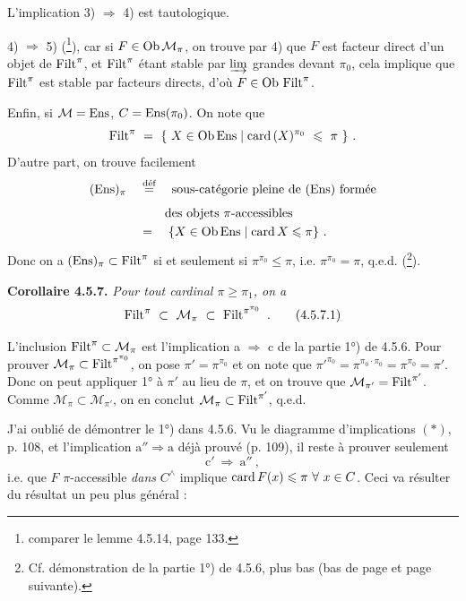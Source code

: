 L'implication 3) $\Longrightarrow$ 4) est tautologique.

4) $\Longrightarrow$ 5) (\footnote{comparer le lemme 4.5.14, page 133.}), car si $F \in \mathrm{Ob}\, \mathcal{M}_\pi$, on trouve par 4) que $F$ est facteur direct d'un objet de $\operatorname{Filt}^\pi$, et $\operatorname{Filt}^\pi$ étant stable par $\varinjlim$
grandes devant $\pi_0$, cela implique que $\operatorname{Filt}^\pi$ est stable par facteurs directs, d'où $F \in \mathrm{Ob}\, \operatorname{Filt}^\pi$.

Enfin, si $\mathcal{M} = \mathrm{Ens}$, $C = \mathrm{Ens}(\pi_0)$. On note que
\[
\operatorname{Filt}^\pi \ = \ \{ \ X \in \mathrm{Ob}\, \mathrm{Ens} \mid \operatorname{card}\,(X)^{\pi_0} \ \leqslant \ \pi \ \} \ .
\]
D'autre part, on trouve facilement
\[
\begin{aligned}
(\Ens)_\pi \quad &\overset{\text{déf}}{=} \quad \text{sous-catégorie pleine de (Ens) formée} \\
&\phantom{\overset{\text{déf}}{=}} \quad \text{des objets $\pi$-accessibles} \\
&= \quad \{ X \in \Ob \Ens \mid \card X \leqslant \pi \} \ .
\end{aligned}
\]
Donc on a $(\mathrm{Ens})_\pi \subset \operatorname{Filt}^\pi$ si et seulement si $\pi^{\pi_0} \leqslant \pi$, i.e. $\pi^{\pi_0} = \pi$, q.e.d. (\footnote{Cf. démonstration de la partie 1°) de 4.5.6, plus bas (bas de page et page suivante).}).

\textbf{Corollaire 4.5.7.} \textit{Pour tout cardinal $\pi \geqslant \pi_1$, on a}
\[
\Filt^\pi \ \subset \ \mathcal{M}_\pi \ \subset \ \Filt^{\pi^{\pi_0}} \ . \tag*{(4.5.7.1)}
\]

L'inclusion $\operatorname{Filt}^\pi \subset \mathcal{M}_\pi$ est l'implication a $\Longrightarrow$ c de la partie 1°) de 4.5.6. Pour prouver $\mathcal{M}_\pi \subset \operatorname{Filt}^{\pi^{\pi_0}}$, on pose $\pi' = \pi^{\pi_0}$ et on note que $\pi'^{\pi_0} = \pi^{\pi_0 \cdot \pi_0} = \pi^{\pi_0} = \pi'$. Donc on peut
appliquer 1° à $\pi'$ au lieu de $\pi$, et on trouve que $\mathcal{M}_{\pi'} = \operatorname{Filt}^{\pi'}$. Comme $\mathcal{M}_\pi \subset \mathcal{M}_{\pi'}$, on en conclut $\mathcal{M}_\pi \subset \operatorname{Filt}^{\pi'}$, q.e.d.

J'ai oublié de démontrer le 1°) dans 4.5.6. Vu le diagramme d'implications $(\ast)$, p. 108, et l'implication $\mathrm{a}'' \Longrightarrow \mathrm{a}$ déjà prouvé (p. 109),
il reste à prouver seulement
\[
\mathrm{c}' \ \Longrightarrow \ \mathrm{a}'' \ ,
\]
i.e. que $F$ $\pi$-accessible \textit{dans} $C^\wedge$ implique $\card F(x) \leqslant \pi \ \forall \ x \in C$. Ceci va résulter du résultat un peu plus général :

